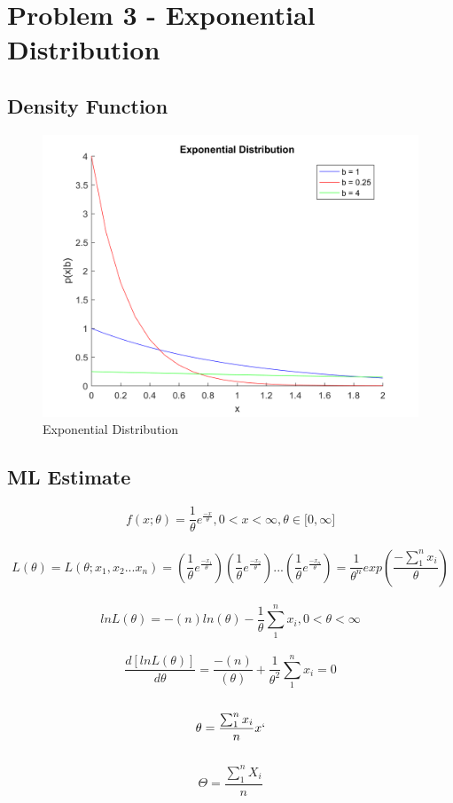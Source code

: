 \documentclass[12pt, letterpaper]{report}
\begin{document}
\section{Problem 3 - Exponential Distribution}

\subsection{Density Function}

\begin{figure}[H]
	\centering
	\includegraphics[width=0.7\columnwidth]{p3a.png}
	\caption{Exponential Distribution}
\end{figure}

\subsection{ML Estimate}


\[ f(x;\theta)=\frac{1}{\theta}{e}^{\frac{-x}{\theta}}, 0<x<\infty, \theta\in{[0,\infty}] \]
\\
\[ L(\theta)=L\left(\theta;{x}_{1},{x}_{2}...{x}_{n} \right)=\left(\frac{1}{\theta}{e}^{\frac{{-x}_{1}}{\theta}}\right)\left(\frac{1}{\theta}{e}^{\frac{{-x}_{2}}{\theta}}\right)...\left(\frac{1}{\theta}{e}^{\frac{{-x}_{n}}{\theta}} \right)=\frac{1}{{\theta}^{n}}exp\left(\frac{-\sum_{1}^{n}{x}_{i}}{\theta} \right) \]
\\
\[lnL\left(\theta\right)=-\left(n \right)ln\left(\theta\right) -\frac{1}{\theta}\sum_{1}^{n}{x}_{i}, 0<\theta<\infty\]
\\
\[\frac{d\left[lnL\left(\theta\right) \right]}{d\theta}=\frac{-\left(n \right)}{\left(\theta\right)} +\frac{1}{{\theta}^{2}}\sum_{1}^{n}{x}_{i}=0\]
\\
\[\theta=\frac{\sum_{1}^{n}{x}_{i}}{n}x`\]
\\
\[\Theta=\frac{\sum_{1}^{n}{X}_{i}}{n}\]
\end{document}
